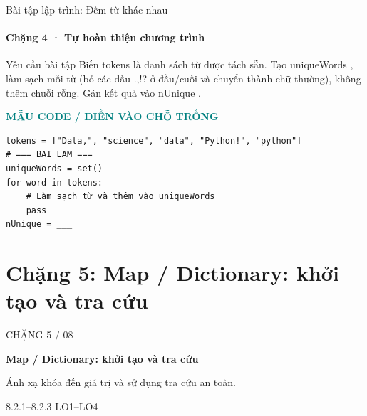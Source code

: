 \documentclass[aspectratio=169,10pt]{beamer}
\begin{document}
\begin{frame}[fragile,t]{Bài tập lập trình: Đếm từ khác nhau}
\framesubtitle{Chặng 4 · Tự hoàn thiện chương trình}
\begin{block}{Yêu cầu bài tập}
Biến tokens là danh sách từ được tách sẵn. Tạo uniqueWords , làm sạch mỗi từ (bỏ các dấu .,!? ở đầu/cuối và chuyển thành chữ thường), không thêm chuỗi rỗng. Gán kết quả vào nUnique .
\end{block}
\textcolor{teal}{\scriptsize\textbf{MẪU CODE / ĐIỀN VÀO CHỖ TRỐNG}}\par
\begin{Verbatim}[fontsize=\scriptsize,frame=single,framesep=3mm,rulecolor=\color{teal!35},breaklines=true]
tokens = ["Data,", "science", "data", "Python!", "python"]
# === BAI LAM ===
uniqueWords = set()
for word in tokens:
    # Làm sạch từ và thêm vào uniqueWords
    pass
nUnique = ___
\end{Verbatim}
\end{frame}

\section{Chặng 5: Map / Dictionary: khởi tạo và tra cứu}

\begin{frame}[plain]
\vfill
{\color{white!65}\Large CHẶNG 5 / 08}\par\medskip
{\color{white}\fontsize{26}{30}\selectfont\bfseries Map / Dictionary: khởi tạo và tra cứu}\par\bigskip
{\color{white!80}\large Ánh xạ khóa đến giá trị và sử dụng tra cứu an toàn.}\par\medskip
{\color{white!80}\normalsize 8.2.1–8.2.3 \hspace{1.2cm} LO1–LO4}
\vfill
\end{frame}
\end{document}
